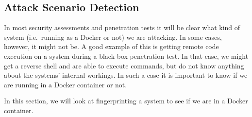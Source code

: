\subsection{Attack Scenario Detection}
In most security assessments and penetration tests it will be clear what kind of system (i.e.\ running as a Docker or not) we are attacking. In some cases, however, it might not be. A good example of this is getting remote code execution on a system during a black box penetration test. In that case, we might get a reverse shell and are able to execute commands, but do not know anything about the systems' internal workings. In such a case it is important to know if we are running in a Docker container or not.

In this section, we will look at fingerprinting a system to see if we are in a Docker container.





